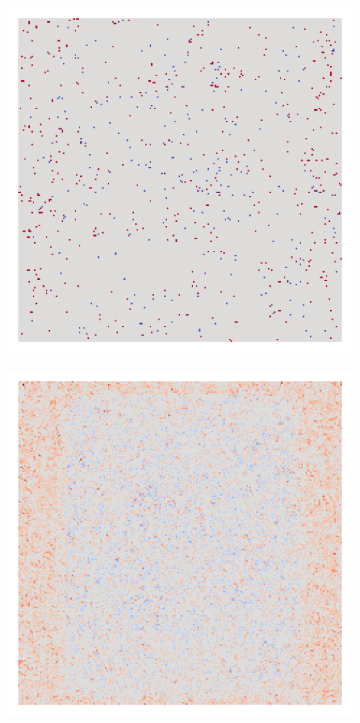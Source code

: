 \begin{figure}[H]
\begin{subfigure}{0.095\linewidth}
        \includegraphics[height=1\linewidth]{01-images/05-resultate/uap_resnet18/uap0-resnet18-mri_data-n200-robustificationslevel1.png}
    \end{subfigure}\hfill%
    \begin{subfigure}{0.095\linewidth}
        \centering
        \includegraphics[height=1\linewidth]{01-images/05-resultate/uap_resnet18/uap0-resnet18-mri_data-n200-robustificationslevel2.png}

\end{subfigure}
\end{figure}
